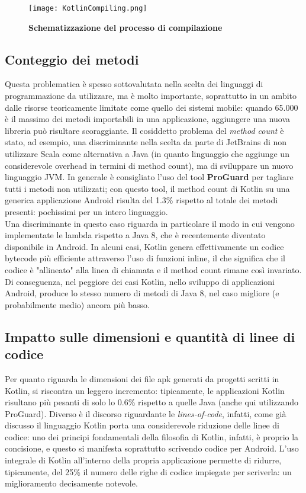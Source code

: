 \begin{figure}[ht]
  \centering
  \texttt{[image: KotlinCompiling.png]}
  \caption{{\bfseries Schematizzazione del processo di compilazione}}
  \label{KotlinCompiling}
\end{figure}

\subsection{Conteggio dei metodi}
Questa problematica è spesso sottovalutata nella scelta dei linguaggi di programmazione da utilizzare, ma è molto importante, soprattutto in un ambito dalle risorse teoricamente limitate come quello dei sistemi mobile: quando 65.000 è il massimo dei metodi importabili in una applicazione, aggiungere una nuova libreria può risultare scoraggiante. Il cosiddetto problema del {\em method count} è stato, ad esempio, una discriminante nella scelta da parte di JetBrains di non utilizzare Scala come alternativa a Java (in quanto linguaggio che aggiunge un considerevole overhead in termini di method count), ma di sviluppare un nuovo linguaggio JVM. In generale è consigliato l'uso del tool {\bfseries ProGuard} per tagliare tutti i metodi non utilizzati; con questo tool, il method count di Kotlin su una generica applicazione Android risulta del 1.3\% rispetto al totale dei metodi presenti: pochissimi per un intero linguaggio.\\
Una discriminante in questo caso riguarda in particolare il modo in cui vengono implementate le lambda rispetto a Java 8, che è recentemente diventato disponibile in Android. In alcuni casi, Kotlin genera effettivamente un codice bytecode più efficiente attraverso l'uso di funzioni inline, il che significa che il codice è "allineato" alla linea di chiamata e il method count rimane così invariato. Di conseguenza, nel peggiore dei casi Kotlin, nello sviluppo di applicazioni Android, produce lo stesso numero di metodi di Java 8, nel caso migliore (e probabilmente medio) ancora più basso.\\

\subsection{Impatto sulle dimensioni e quantità di linee di codice}
Per quanto riguarda le dimensioni dei file apk generati da progetti scritti in Kotlin, si riscontra un leggero incremento: tipicamente, le applicazioni Kotlin risultano più pesanti di solo lo 0.6\% rispetto a quelle Java (anche qui utilizzando ProGuard). Diverso è il discorso riguardante le {\em lines-of-code}, infatti, come già discusso il linguaggio Kotlin porta una considerevole riduzione delle linee di codice: uno dei principi fondamentali della filosofia di Kotlin, infatti, è proprio la concisione, e questo si manifesta soprattutto scrivendo codice per Android. L'uso integrale di Kotlin all'interno della propria applicazione permette di ridurre, tipicamente, del 25\% il numero delle righe di codice impiegate per scriverla: un miglioramento decisamente notevole.\\

